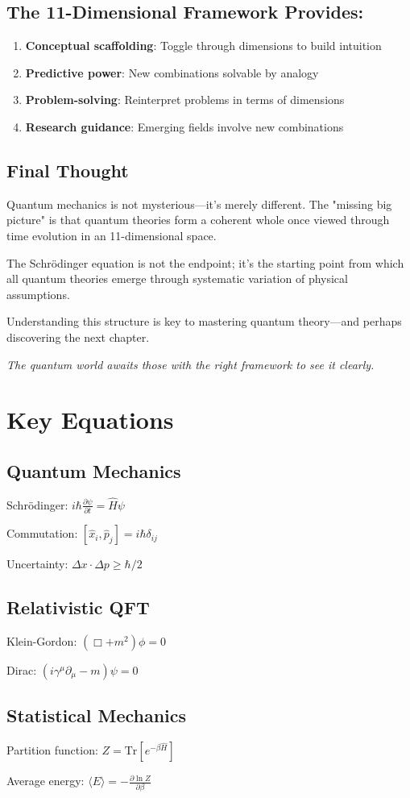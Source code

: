 \documentclass[12pt,oneside]{book}
\begin{document}
\section{The 11-Dimensional Framework Provides:}

\begin{enumerate}
  \item \textbf{Conceptual scaffolding}: Toggle through dimensions to build intuition
  \item \textbf{Predictive power}: New combinations solvable by analogy
  \item \textbf{Problem-solving}: Reinterpret problems in terms of dimensions
  \item \textbf{Research guidance}: Emerging fields involve new combinations
\end{enumerate}

\section{Final Thought}

Quantum mechanics is not mysterious—it's merely different. The "missing big picture" is that quantum theories form a coherent whole once viewed through time evolution in an 11-dimensional space.

The Schrödinger equation is not the endpoint; it's the starting point from which all quantum theories emerge through systematic variation of physical assumptions.

Understanding this structure is key to mastering quantum theory—and perhaps discovering the next chapter.

\vspace{2cm}
\noindent\textit{The quantum world awaits those with the right framework to see it clearly.}

\appendix

\chapter{Key Equations}

\section{Quantum Mechanics}

Schrödinger: $i\hbar\frac{\partial\psi}{\partial t} = \hat{H}\psi$

Commutation: $[\hat{x}_i, \hat{p}_j] = i\hbar\delta_{ij}$

Uncertainty: $\Delta x \cdot \Delta p \geq \hbar/2$

\section{Relativistic QFT}

Klein-Gordon: $(\Box + m^2)\phi = 0$

Dirac: $(i\gamma^\mu\partial_\mu - m)\psi = 0$

\section{Statistical Mechanics}

Partition function: $Z = \text{Tr}[e^{-\beta\hat{H}}]$

Average energy: $\langle E \rangle = -\frac{\partial \ln Z}{\partial \beta}$
\end{document}
